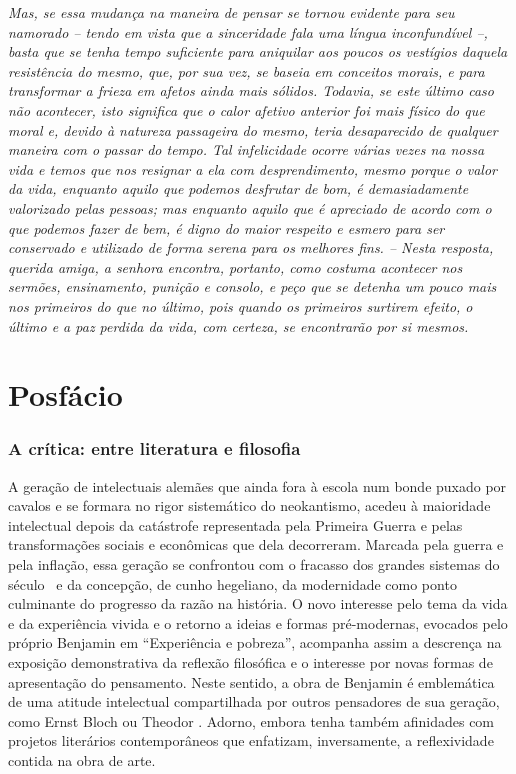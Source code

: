 \emph{Mas, se essa mudança na maneira de pensar se tornou evidente para
seu namorado -- tendo em vista que a sinceridade fala uma língua
inconfundível --, basta que se tenha tempo suficiente para aniquilar aos
poucos os vestígios daquela resistência do mesmo, que, por sua vez, se
baseia em conceitos morais, e para transformar a frieza em afetos ainda
mais sólidos. Todavia, se este último caso não acontecer, isto significa
que o calor afetivo anterior foi mais físico do que moral e, devido à
natureza passageira do mesmo, teria desaparecido de qualquer maneira com
o passar do tempo. Tal infelicidade ocorre várias vezes na nossa vida e
temos que nos resignar a ela com desprendimento, mesmo porque o valor da
vida, enquanto aquilo que podemos desfrutar de bom, é demasiadamente
valorizado pelas pessoas; mas enquanto aquilo que é apreciado de acordo
com o que podemos fazer de bem, é digno do maior respeito e esmero para
ser conservado e utilizado de forma serena para os melhores fins. --
Nesta resposta, querida amiga, a senhora encontra, portanto, como
costuma acontecer nos sermões, ensinamento, punição e consolo, e peço
que se detenha um pouco mais nos primeiros do que no último, pois quando
os primeiros surtirem efeito, o último e a paz perdida da vida, com
certeza, se encontrarão por si mesmos.}

\part{Posfácio}


\section{A crítica: entre literatura e filosofia}

A geração de intelectuais alemães que ainda fora à escola num bonde
puxado por cavalos e se formara no rigor sistemático do neokantismo,
acedeu à maioridade intelectual depois da catástrofe representada pela
Primeira Guerra e pelas transformações sociais e econômicas que dela
decorreram. Marcada pela guerra e pela inflação, essa geração se
confrontou com o fracasso dos grandes sistemas do século~ e da
concepção, de cunho hegeliano, da modernidade como ponto culminante do
progresso da razão na história. O novo interesse pelo tema da vida e da
experiência vivida e o retorno a ideias e formas pré-modernas, evocados
pelo próprio Benjamin em ``Experiência e pobreza'', acompanha assim a
descrença na exposição demonstrativa da reflexão filosófica e o
interesse por novas formas de apresentação do pensamento. Neste sentido,
a obra de Benjamin é emblemática de uma atitude intelectual
compartilhada por outros pensadores de sua geração, como Ernst Bloch ou
Theodor . Adorno, embora tenha também afinidades com projetos
literários contemporâneos que enfatizam, inversamente, a reflexividade
contida na obra de arte.


